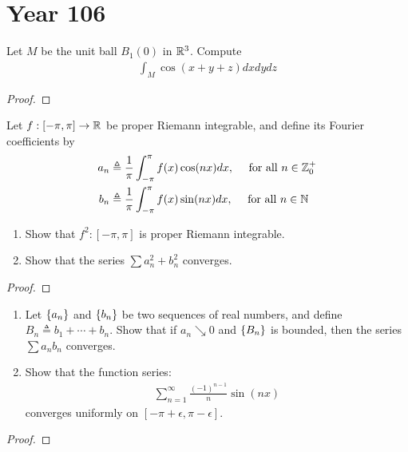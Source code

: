 \documentclass{report}
\begin{document}
\section{Year 106}
\begin{question}{}{}
Let $M$ be the unit ball  $B_1(0)$ in $\mathbb{R}^3$. Compute 
 \begin{align*}
\int_M \cos (x+y+z)dxdydz
\end{align*}
\end{question}
\begin{proof}

\end{proof}
\begin{question}{}{}
Let $f:[-\pi ,\pi ]\rightarrow \mathbb{R}$ be proper Riemann integrable, and define its Fourier coefficients by 
\begin{align*}
  a_n&\triangleq \frac{1}{\pi }\int_{-\pi }^{\pi } f(x)\cos (nx)dx,\quad \text{ for all }n \in \mathbb{Z}_0^+ \\
  b_n &\triangleq \frac{1}{\pi }\int_{-\pi }^{\pi }f(x)\sin (nx)dx,\quad \text{ for all }n\in\mathbb{N}
\end{align*}
\begin{enumerate}[label=(\roman*)]
  \item Show that $f^2:[-\pi ,\pi ]$ is proper Riemann integrable. 
  \item Show that the series $\sum a_n^2 +b_n^2$ converges. 
\end{enumerate}
\end{question}
\begin{proof}

\end{proof}
\begin{question}{}{}
\begin{enumerate}[label=(\roman*)]
  \item Let $\left\{ a_n \right\}$ and $\left\{ b_n \right\}$ be two sequences of real numbers, and define $B_n\triangleq b_1 + \cdots +b_n$. Show that if $a_n\searrow 0$ and  $\left\{ B_n \right\}$ is bounded, then the series $\sum a_nb_n$ converges. 
  \item Show that the function series: 
    \begin{align*}
    \sum_{n=1}^{\infty} \frac{(-1)^{n-1}}{n} \sin (nx)
    \end{align*}
    converges uniformly on $[-\pi +\epsilon ,\pi -\epsilon ]$. 
\end{enumerate}
\end{question}
\begin{proof}

\end{proof}
\end{document}
